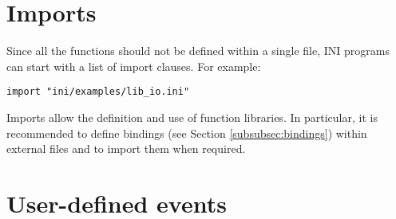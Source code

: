 \documentclass[11pt]{report}
\begin{document}
\section{Imports\label{sec:imports}}

Since all the functions should not be defined within a single file, INI programs can start with a list of import clauses. For example:

\begin{lstlisting}[numbers=none]
import "ini/examples/lib_io.ini"
\end{lstlisting}

Imports allow the definition and use of function libraries. In particular, it is recommended to define bindings (see Section \ref{subsubsec:bindings}) within external files and to import them when required.

\section{User-defined events}
\end{document}
